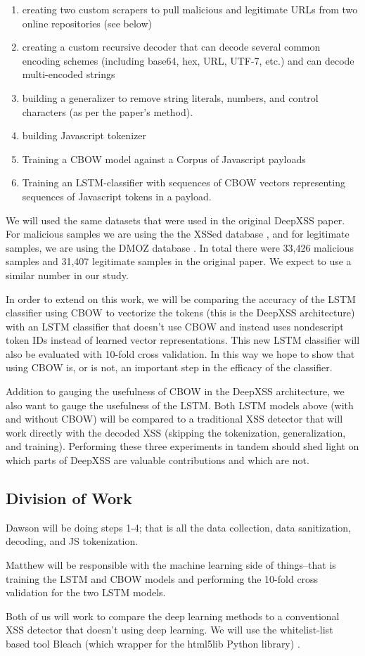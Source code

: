 \documentclass{llncs}
\begin{document}
\begin{enumerate}
    \item creating two custom scrapers to pull malicious and legitimate URLs from two online repositories (see below)
    \item creating a custom recursive decoder that can decode several common encoding schemes (including base64, hex, URL, UTF-7, etc.) and can decode multi-encoded strings 
    \item building a generalizer to remove string literals, numbers, and control characters (as per the paper's method).
    \item building Javascript tokenizer
    \item Training a CBOW model against a Corpus of Javascript payloads
    \item Training an LSTM-classifier with sequences of CBOW vectors representing sequences of Javascript tokens in a payload.
\end{enumerate}

We will used the same datasets that were used in the original DeepXSS paper. For malicious samples we are using the the XSSed database \cite{xssed}, and for legitimate samples, we are using the DMOZ database \cite{dmoz}. In total there were 33,426 malicious samples and 31,407 legitimate samples in the original paper. We expect to use a similar number in our study.

In order to extend on this work, we will be comparing the accuracy of the LSTM classifier using CBOW to vectorize the tokens (this is the DeepXSS architecture) with an LSTM classifier that doesn't use CBOW and instead uses nondescript token IDs instead of learned vector representations. This new LSTM classifier will also be evaluated with 10-fold cross validation. In this way we hope to show that using CBOW is, or is not, an important step in the efficacy of the classifier. 

Addition to gauging the usefulness of CBOW in the DeepXSS architecture, we also want to gauge the usefulness of the LSTM. Both LSTM models above (with and without CBOW) will be compared to a traditional XSS detector that will work directly with the decoded XSS (skipping the tokenization, generalization, and training). Performing these three experiments in tandem should shed light on which parts of DeepXSS are valuable contributions and which are not. 

\subsection{Division of Work}
Dawson will be doing steps 1-4; that is all the data collection, data sanitization, decoding, and JS tokenization. 

Matthew will be responsible with the machine learning side of things--that is training the LSTM and CBOW models and performing the 10-fold cross validation for the two LSTM models.

Both of us will work to compare the deep learning methods to a conventional XSS detector that doesn't using deep learning. We will use the whitelist-list based tool Bleach (which wrapper for the html5lib Python library)  \cite{bleach}.


\newpage


\end{document}

